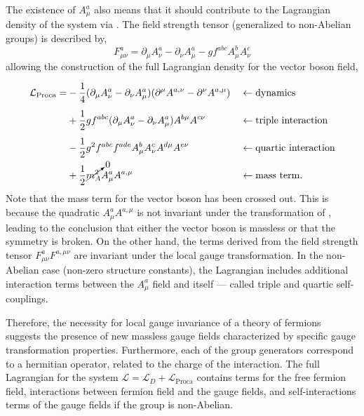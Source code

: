 The existence of $A_\mu^a$ also means that it should contribute to the Lagrangian density of the system via .
The field strength tensor (generalized to non-Abelian groups) is described by,
\begin{equation}
	\label{eq:field_strength_tensor}
	F_{\mu\nu}^a = \partial_\mu A_\nu^a - \partial_\nu A_\mu^a - g f^{abc} A_\mu^b A_\nu^c
\end{equation}
allowing the construction of the full Lagrangian density for the vector boson field,
\begin{align}
	\label{eq:boson}
	\mathcal{L}_\text{Proca} =
	 & \vphantom{\cancelto{0}{m_A^2}} -\frac{1}{4}(\partial_\mu A_\nu^a - \partial_\nu A_\mu^a) (\partial^\mu A^{a,\nu} - \partial^\nu A^{a,\mu}) &  & \leftarrow \text{dynamics}            \\
	 & \vphantom{\cancelto{0}{m_A^2}} + \frac{1}{2} g f^{abc} (\partial_\mu A_\nu^a - \partial_\nu A_\mu^a) A^{b\mu} A^{c\nu}                     &  & \leftarrow \text{triple interaction}  \\
	 & \vphantom{\cancelto{0}{m_A^2}} - \frac{1}{2} g^2 f^{abc} f^{ade} A_\mu^b A_\nu^c A^{d\mu} A^{e\nu}                                         &  & \leftarrow \text{quartic interaction} \\
	 & + \frac{1}{2} \cancelto{0}{m_A^2} A_\mu^a A^{a,\mu}                                                                                        &  & \leftarrow \text{mass term}.
\end{align}
Note that the mass term for the vector boson has been crossed out.
This is because the quadratic $A_\mu^a A^{a,\mu}$ is not invariant under the transformation of , leading to the conclusion that either the vector boson is massless or that the symmetry is broken.
On the other hand, the terms derived from the field strength tensor $F_{\mu\nu}^a F^{a,\mu\nu}$ are invariant under the local gauge transformation.
In the non-Abelian case (non-zero structure constants), the Lagrangian includes additional interaction terms between the $A_\mu^a$ field and itself --- called triple and quartic self-couplings.

Therefore, the necessity for local gauge invariance of a theory of fermions suggests the presence of new massless gauge fields characterized by specific gauge transformation properties.
Furthermore, each of the group generators correspond to a hermitian operator, related to the charge of the interaction.
The full Lagrangian for the system $\mathcal{L} = \mathcal{L}_D + \mathcal{L}_\text{Proca}$ contains terms for the free fermion field, interactions between fermion field and the gauge fields, and self-interactions terms of the gauge fields if the group is non-Abelian.

